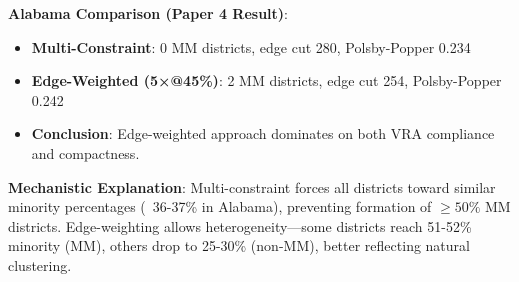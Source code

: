 \textbf{Alabama Comparison (Paper 4 Result)}:
\begin{itemize}
    \item \textbf{Multi-Constraint}: 0 MM districts, edge cut 280, Polsby-Popper 0.234
    \item \textbf{Edge-Weighted (5×@45\%)}: 2 MM districts, edge cut 254, Polsby-Popper 0.242
    \item \textbf{Conclusion}: Edge-weighted approach dominates on both VRA compliance and compactness.
\end{itemize}

\textbf{Mechanistic Explanation}: Multi-constraint forces all districts toward similar minority percentages (~36-37\% in Alabama), preventing formation of $\geq 50\%$ MM districts. Edge-weighting allows heterogeneity---some districts reach 51-52\% minority (MM), others drop to 25-30\% (non-MM), better reflecting natural clustering.
